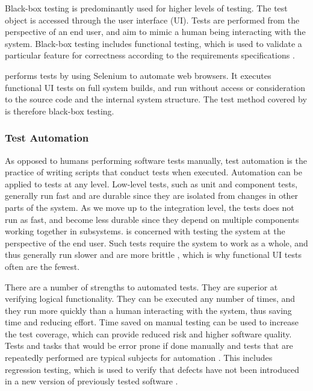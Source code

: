 Black-box testing is predominantly used for higher levels of testing. The test object is accessed through the user interface (UI). Tests are performed from the perspective of an end user, and aim to mimic a human being interacting with the system. Black-box testing includes functional testing, which is used to validate a particular feature for correctness according to the requirements specifications \cite{SoftwareTestingFoundations}.

\toolname \space performs tests by using Selenium to automate web browsers. It executes functional UI tests on full system builds, and run without access or consideration to the source code and the internal system structure. The test method covered by \toolname \space is therefore black-box testing.




\subsubsection{Test Automation}
As opposed to humans performing software tests manually, test automation is the practice of writing scripts that conduct tests when executed. Automation can be applied to tests at any level. Low-level tests, such as unit and component tests, generally run fast and are durable since they are isolated from changes in other parts of the system. As we move up to the integration level, the tests does not run as fast, and become less durable since they depend on multiple components working together in subsystems. \toolname \space is concerned with testing the system at the perspective of the end user. Such tests require the system to work as a whole, and thus generally run slower and are more brittle \cite{pluralsight_endtoend}, which is why functional UI tests often are the fewest.


There are a number of strengths to automated tests. They are superior at verifying logical functionality. They can be executed any number of times, and they run more quickly than a human interacting with the system, thus saving time and reducing effort. Time saved on manual testing can be used to increase the test coverage, which can provide reduced risk and higher software quality. Tests and tasks that would be error prone if done manually and tests that are repeatedly performed are typical subjects for automation \cite{ASTvol3}. This includes regression testing, which is used to verify that defects have not been introduced in a new version of previously tested software \cite{SoftwareTestingFoundations}.


